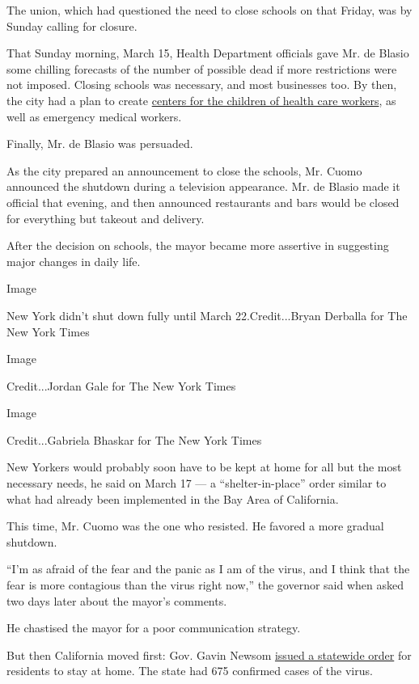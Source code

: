 The union, which had questioned the need to close schools on that
Friday, was by Sunday calling for closure.

That Sunday morning, March 15, Health Department officials gave Mr. de
Blasio some chilling forecasts of the number of possible dead if more
restrictions were not imposed. Closing schools was necessary, and most
businesses too. By then, the city had a plan to create
\href{https://www.schools.nyc.gov/enrollment/enrollment-help/regional-enrichment-centers}{centers
for the children of health care workers}, as well as emergency medical
workers.

Finally, Mr. de Blasio was persuaded.

As the city prepared an announcement to close the schools, Mr. Cuomo
announced the shutdown during a television appearance. Mr. de Blasio
made it official that evening, and then announced restaurants and bars
would be closed for everything but takeout and delivery.

After the decision on schools, the mayor became more assertive in
suggesting major changes in daily life.

Image

New York didn't shut down fully until March 22.Credit...Bryan Derballa
for The New York Times

Image

Credit...Jordan Gale for The New York Times

Image

Credit...Gabriela Bhaskar for The New York Times

New Yorkers would probably soon have to be kept at home for all but the
most necessary needs, he said on March 17 --- a ``shelter-in-place''
order similar to what had already been implemented in the Bay Area of
California.

This time, Mr. Cuomo was the one who resisted. He favored a more gradual
shutdown.

``I'm as afraid of the fear and the panic as I am of the virus, and I
think that the fear is more contagious than the virus right now,'' the
governor said when asked two days later about the mayor's comments.

He chastised the mayor for a poor communication strategy.

But then California moved first: Gov. Gavin Newsom
\href{https://www.nytimes3xbfgragh.onion/2020/03/19/us/California-stay-at-home-order-virus.html}{issued
a statewide order} for residents to stay at home. The state had 675
confirmed cases of the virus.

